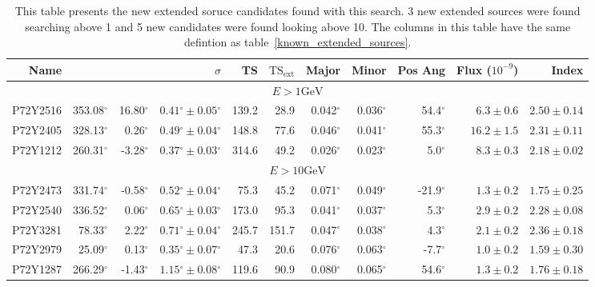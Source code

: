 \documentclass[preprint]{aastex}
\newcommand{\gev}{\text{GeV}\xspace}
\newcommand{\tsext}{{\ensuremath{\text{TS}_\text{ext}}}\xspace}
\newcommand{\glon}{\text{GLON}\xspace}
\newcommand{\glat}{\text{GLAT}\xspace}
\renewcommand{\deg}{\ensuremath{^\circ}\xspace}
\begin{document}
\begin{table}
  \begin{centering}
    \begin{tabular}{r|rrrrrrrrrr}
      \hline
      \hline
      Name                 &          \glon &          \glat &                    $\sigma$ &       TS &   $\tsext$ &      Major &      Minor &    Pos Ang &      Flux ($10^{-9}$) &                 Index \\
      \hline
      \multicolumn{11}{c}{$E > 1\gev$} \\
      \hline
      P72Y2516             &     353.08\deg &      16.80\deg & $  0.41\deg \pm   0.05\deg$ &    139.2 &       28.9 &  0.042\deg &  0.036\deg &   54.4\deg & $    6.3 \pm     0.6$ & $   2.50 \pm    0.14$ \\
      P72Y2405             &     328.13\deg &       0.26\deg & $  0.49\deg \pm   0.04\deg$ &    148.8 &       77.6 &  0.046\deg &  0.041\deg &   55.3\deg & $   16.2 \pm     1.5$ & $   2.31 \pm    0.11$ \\
      P72Y1212             &     260.31\deg &      -3.28\deg & $  0.37\deg \pm   0.03\deg$ &    314.6 &       49.2 &  0.026\deg &  0.023\deg &    5.0\deg & $    8.3 \pm     0.3$ & $   2.18 \pm    0.02$ \\
      \hline
      \multicolumn{11}{c}{$E > 10\gev$} \\
      \hline
      P72Y2473             &     331.74\deg &      -0.58\deg & $  0.52\deg \pm   0.04\deg$ &     75.3 &       45.2 &  0.071\deg &  0.049\deg &  -21.9\deg & $    1.3 \pm     0.2$ & $   1.75 \pm    0.25$ \\
      P72Y2540             &     336.52\deg &       0.06\deg & $  0.65\deg \pm   0.03\deg$ &    173.0 &       95.3 &  0.041\deg &  0.037\deg &    5.3\deg & $    2.9 \pm     0.2$ & $   2.28 \pm    0.08$ \\
      P72Y3281             &      78.33\deg &       2.22\deg & $  0.71\deg \pm   0.04\deg$ &    245.7 &      151.7 &  0.047\deg &  0.038\deg &    4.3\deg & $    2.1 \pm     0.2$ & $   2.36 \pm    0.18$ \\
      P72Y2979             &      25.09\deg &       0.13\deg & $  0.35\deg \pm   0.07\deg$ &     47.3 &       20.6 &  0.076\deg &  0.063\deg &   -7.7\deg & $    1.0 \pm     0.2$ & $   1.59 \pm    0.30$ \\
      P72Y1287             &     266.29\deg &      -1.43\deg & $  1.15\deg \pm   0.08\deg$ &    119.6 &       90.9 &  0.080\deg &  0.065\deg &   54.6\deg & $    1.3 \pm     0.2$ & $   1.76 \pm    0.18$ \\
      \hline
    \end{tabular}
    \caption{This table presents the new extended soruce candidates found with
    this search. 3 new extended sources were found searching above 1\gev and
    5 new candidates were found looking above 10\gev.
    The columns in this table have the same defintion as table~\ref{known_extended_sources}.}
    \label{new_ext_srcs}
  \end{centering}
\end{table}
\end{document}
